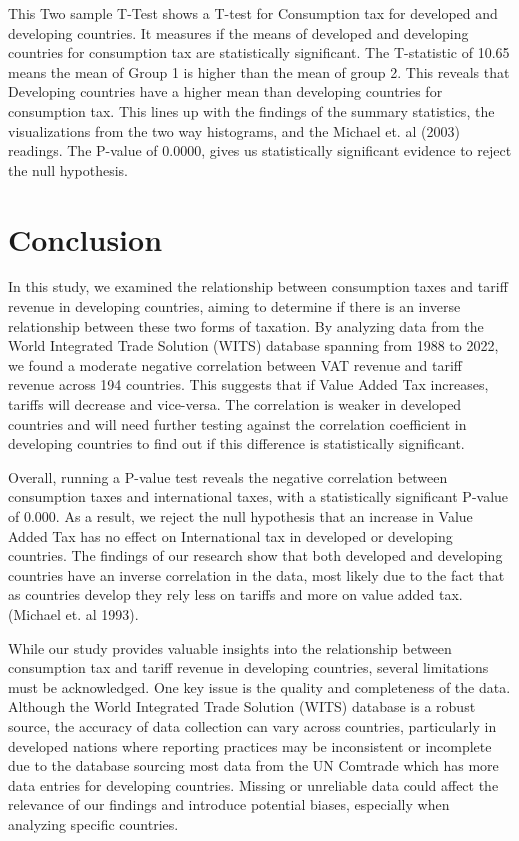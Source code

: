 \documentclass[12pt]{article}
\begin{document}
This Two sample T-Test shows a T-test for Consumption tax for developed and developing countries. It measures if the means of developed and developing countries for consumption tax are statistically significant. The T-statistic of 10.65 means the mean of Group 1 is higher than the mean of group 2. This reveals that Developing countries have a higher mean than developing countries for consumption tax. This lines up with the findings of the summary statistics, the visualizations from the two way histograms, and the Michael et. al (2003) readings. The P-value of 0.0000, gives us statistically significant evidence to reject the null hypothesis. 


\section{Conclusion}
\label{sec:conclusion}

In this study, we examined the relationship between consumption taxes and tariff revenue in developing countries, aiming to determine if there is an inverse relationship between these two forms of taxation. By analyzing data from the World Integrated Trade Solution (WITS) database spanning from 1988 to 2022, we found a moderate negative correlation between VAT revenue and tariff revenue across 194 countries. This suggests that if Value Added Tax increases, tariffs will decrease and vice-versa. The correlation is weaker in developed countries and will need further testing against the correlation coefficient in developing countries to find out if this difference is statistically significant. 

Overall, running a P-value test reveals the negative correlation between consumption taxes and international taxes, with a statistically significant P-value of 0.000. As a result, we reject the null hypothesis that an increase in Value Added Tax has no effect on International tax in developed or developing countries. The findings of our research show that both developed and developing countries have an inverse correlation in the data, most likely due to the fact that as countries develop they rely less on tariffs and more on value added tax. (Michael et. al 1993). 

While our study provides valuable insights into the relationship between consumption tax and tariff revenue in developing countries, several limitations must be acknowledged. One key issue is the quality and completeness of the data. Although the World Integrated Trade Solution (WITS) database is a robust source, the accuracy of data collection can vary across countries, particularly in developed nations where reporting practices may be inconsistent or incomplete due to the database sourcing most data from the UN Comtrade which has more data entries for developing countries. Missing or unreliable data could affect the relevance of our findings and introduce potential biases, especially when analyzing specific countries. 
\end{document}
